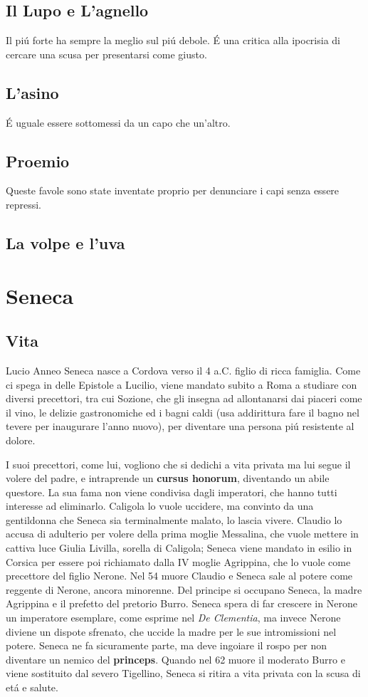 \documentclass{article}
\begin{document}
\subsection{Il Lupo e L'agnello}
Il piú forte ha sempre la meglio sul piú debole. É una critica alla ipocrisia di cercare una scusa per presentarsi come giusto.
\subsection{L'asino}
É uguale essere sottomessi da un capo che un'altro.
\subsection{Proemio}
Queste favole sono state inventate proprio per denunciare i capi senza essere repressi.
\subsection{La volpe e l'uva}
\section{Seneca}
\subsection{Vita}
Lucio Anneo Seneca nasce a Cordova verso il 4 a.C. figlio di ricca famiglia. Come ci spega in delle Epistole a Lucilio, viene mandato subito a Roma a studiare con diversi precettori, tra cui Sozione, che gli insegna ad allontanarsi dai piaceri come il vino, le delizie gastronomiche ed i bagni caldi (usa addirittura fare il bagno nel tevere per inaugurare l'anno nuovo), per diventare una persona piú resistente al dolore.

I suoi precettori, come lui, vogliono che si dedichi a vita privata ma lui segue il volere del padre, e intraprende un \textbf{cursus honorum}, diventando un abile questore. La sua fama non viene condivisa dagli imperatori, che hanno tutti interesse ad eliminarlo. Caligola lo vuole uccidere, ma convinto da una gentildonna che Seneca sia terminalmente malato, lo lascia vivere. Claudio lo accusa di adulterio per volere della prima moglie Messalina, che vuole mettere in cattiva luce Giulia Livilla, sorella di Caligola; Seneca viene mandato in esilio in Corsica per essere poi richiamato dalla IV moglie Agrippina, che lo vuole come precettore del figlio Nerone. Nel 54 muore Claudio e Seneca sale al potere come reggente di Nerone, ancora minorenne. Del principe si occupano Seneca, la madre Agrippina e il prefetto del pretorio Burro. Seneca spera di far crescere in Nerone un imperatore esemplare, come esprime nel \emph{De Clementia}, ma invece Nerone diviene un dispote sfrenato, che uccide la madre per le sue intromissioni nel potere. Seneca ne fa sicuramente parte, ma deve ingoiare il rospo per non diventare un nemico del \textbf{princeps}. Quando nel 62 muore il moderato Burro e viene sostituito dal severo Tigellino, Seneca si ritira a vita privata con la scusa di etá e salute.
\end{document}
